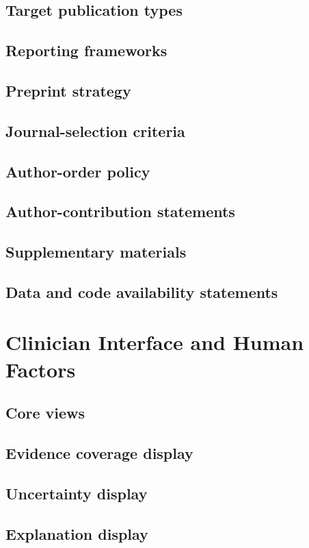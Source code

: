 \documentclass[11pt,journal,onecolumn,draftclsnofoot]{IEEEtran}
\begin{document}
\subsection{Target publication types}
\subsection{Reporting frameworks}
\subsection{Preprint strategy}
\subsection{Journal-selection criteria}
\subsection{Author-order policy}
\subsection{Author-contribution statements}
\subsection{Supplementary materials}
\subsection{Data and code availability statements}

\section{Clinician Interface and Human Factors}
\subsection{Core views}
\subsection{Evidence coverage display}
\subsection{Uncertainty display}
\subsection{Explanation display}
\end{document}
